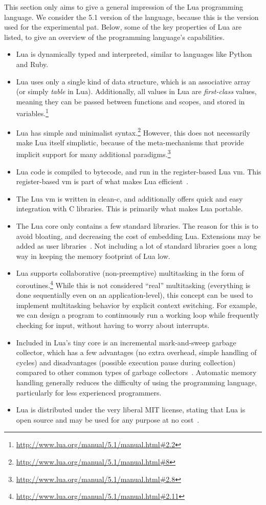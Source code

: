 \noindent
This section only aims to give a general impression of the Lua programming language. We consider the 5.1 version of the language, because this is the version used for the experimental pat. Below, some of the key properties of Lua are listed, to give an overview of the programming language's capabilities.
\begin{itemize}
	\item Lua is dynamically typed and interpreted, similar to languages like Python and Ruby.
	\item Lua uses only a single kind of data structure, which is an associative array (or simply \emph{table} in Lua). Additionally, all values in Lua are \emph{first-class} values, meaning they can be passed between functions and scopes, and stored in variables.\footnote{\url{http://www.lua.org/manual/5.1/manual.html\#2.2}}
	\item Lua has simple and minimalist syntax.\footnote{\url{http://www.lua.org/manual/5.1/manual.html\#8}} However, this does not necessarily make Lua itself simplistic, because of the meta-mechanisms that provide implicit support for many additional paradigms.\footnote{\url{http://www.lua.org/manual/5.1/manual.html\#2.8}}
	\item Lua code is compiled to bytecode, and run in the register-based Lua \gls{vm}. This register-based \gls{vm} is part of what makes Lua efficient~\cite{article:the_implementation_of_lua}.
	\item The Lua \gls{vm} is written in \gls{clean-c}, and additionally offers quick and easy integration with C libraries. This is primarily what makes Lua portable.
	\item The Lua core only contains a few standard libraries. The reason for this is to avoid bloating, and decreasing the cost of embedding Lua. Extensions may be added as user libraries~\cite{article:the_implementation_of_lua}. Not including a lot of standard libraries goes a long way in keeping the memory footprint of Lua low.
	\item Lua supports collaborative (non-preemptive) multitasking in the form of coroutines.\footnote{\url{http://www.lua.org/manual/5.1/manual.html\#2.11}} While this is not considered ``real'' multitasking (everything is done sequentially even on an application-level), this concept can be used to implement multitasking behavior by explicit context switching. For example, we can design a program to continuously run a working loop while frequently checking for input, without having to worry about interrupts. 
	\item Included in Lua's tiny core is an incremental mark-and-sweep garbage collector, which has a few advantages (no extra overhead, simple handling of cycles) and disadvantages (possible execution pause during collection) compared to other common types of garbage collectors~\cite{inproceedings:the_evolution_of_lua}. Automatic memory handling generally reduces the difficulty of using the programming language, particularly for less experienced programmers.
	\item Lua is distributed under the very liberal MIT license, stating that Lua is open source and may be used for any purpose at no cost~\cite{website:lua_license}.
\end{itemize}

